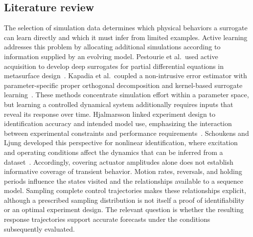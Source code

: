 \subsection{Literature review}
\label{sec:intro:literature}

The selection of simulation data determines which physical behaviors a surrogate can learn directly and which it must infer from limited examples. Active learning addresses this problem by allocating additional simulations according to information supplied by an evolving model. Pestourie et al.\ used active acquisition to develop deep surrogates for partial differential equations in metasurface design~\cite{pestourie2020surrogates}. Kapadia et al.\ coupled a non-intrusive error estimator with parameter-specific proper orthogonal decomposition and kernel-based surrogate learning~\cite{kapadia2024surrogate}. These methods concentrate simulation effort within a parameter space, but learning a controlled dynamical system additionally requires inputs that reveal its response over time. Hjalmarsson linked experiment design to identification accuracy and intended model use, emphasizing the interaction between experimental constraints and performance requirements~\cite{hjalmarsson2005experiment}. Schoukens and Ljung developed this perspective for nonlinear identification, where excitation and operating conditions affect the dynamics that can be inferred from a dataset~\cite{schoukens2019roadmap}. Accordingly, covering actuator amplitudes alone does not establish informative coverage of transient behavior. Motion rates, reversals, and holding periods influence the states visited and the relationships available to a sequence model. Sampling complete control trajectories makes these relationships explicit, although a prescribed sampling distribution is not itself a proof of identifiability or an optimal experiment design. The relevant question is whether the resulting response trajectories support accurate forecasts under the conditions subsequently evaluated.

